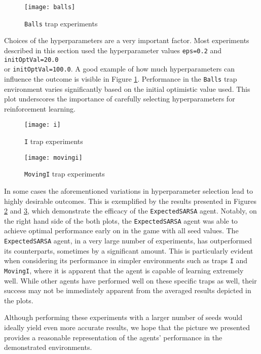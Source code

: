 \begin{figure}[h]
    \centering
    \texttt{[image: balls]}
    \caption{\texttt{Balls} trap experiments}
    \label{fig:balls_eg}
\end{figure}

Choices of the hyperparameters are a very important factor. Most experiments described in this section used the hyperparameter values \texttt{eps=0.2} and \texttt{initOptVal=20.0}\\ or \texttt{initOptVal=100.0}. A good example of how much hyperparameters can influence the outcome is visible in Figure \ref{fig:balls_eg}. Performance in the \texttt{Balls} trap environment varies significantly based on the initial optimistic value used. This plot underscores the importance of carefully selecting hyperparameters for reinforcement learning.

\begin{figure}[h]
    \centering
    \texttt{[image: i]}
    \caption{\texttt{I} trap experiments}
    \label{fig:i_eg}
\end{figure}

\begin{figure}[h]
    \centering
    \texttt{[image: movingi]}
    \caption{\texttt{MovingI} trap experiments}
    \label{fig:movingi_eg}
\end{figure}

In some cases the aforementioned variations in hyperparameter selection lead to highly desirable outcomes. This is exemplified by the results presented in Figures \ref{fig:i_eg} and \ref{fig:movingi_eg}, which demonstrate the efficacy of the \texttt{ExpectedSARSA} agent. Notably, on the right hand side of the both plots, the \texttt{ExpectedSARSA} agent was able to achieve optimal performance early on in the game with all seed values. The \texttt{ExpectedSARSA} agent, in a very large number of experiments, has outperformed its counterparts, sometimes by a significant amount. This is particularly evident when considering its performance in simpler environments such as traps \texttt{I} and \texttt{MovingI}, where it is apparent that the agent is capable of learning extremely well. While other agents have performed well on these specific traps as well, their success may not be immediately apparent from the averaged results depicted in the plots.

Although performing these experiments with a larger number of seeds would ideally yield even more accurate results, we hope that the picture we presented provides a reasonable representation of the agents' performance in the demonstrated environments.

